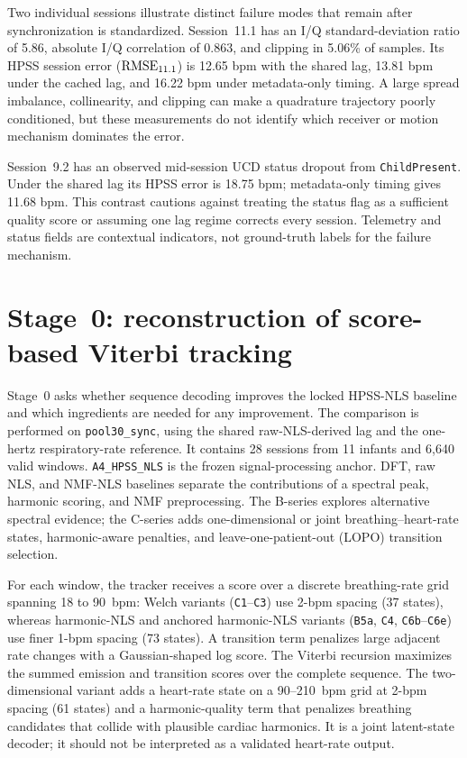 Two individual sessions illustrate distinct failure modes that remain after synchronization is
standardized. Session~11.1 has an I/Q standard-deviation ratio of 5.86, absolute I/Q correlation
of 0.863, and clipping in 5.06\% of samples. Its HPSS session error ($\mathrm{RMSE}_{11.1}$) is 12.65 bpm with the shared
lag, 13.81 bpm under the cached lag, and 16.22 bpm under metadata-only timing. A large spread
imbalance, collinearity, and clipping can make a quadrature trajectory poorly conditioned, but
these measurements do not identify which receiver or motion mechanism dominates the error.

Session~9.2 has an observed mid-session UCD status dropout from \texttt{ChildPresent}. Under the shared
lag its HPSS error is 18.75 bpm; metadata-only timing gives 11.68 bpm. This contrast cautions
against treating the status flag as a sufficient quality score or assuming one lag regime corrects
every session. Telemetry and status fields are contextual indicators, not ground-truth labels for
the failure mechanism.

\section{Stage~0: reconstruction of score-based Viterbi tracking}
\label{sec:ch3_viterbi_methods}

Stage~0 asks whether sequence decoding improves the locked HPSS-NLS baseline and which ingredients
are needed for any improvement. The comparison is performed on \texttt{pool30\_sync}, using the shared
raw-NLS-derived lag and the one-hertz respiratory-rate reference. It contains 28 sessions from 11
infants and 6,640 valid windows. \texttt{A4\_HPSS\_NLS} is the frozen signal-processing anchor. DFT, raw
NLS, and NMF-NLS baselines separate the contributions of a spectral peak, harmonic scoring, and
NMF preprocessing. The B-series explores alternative spectral evidence; the C-series adds
one-dimensional or joint breathing--heart-rate states, harmonic-aware penalties, and
leave-one-patient-out (LOPO) transition selection.

For each window, the tracker receives a score over a discrete breathing-rate grid spanning
18 to 90~bpm: Welch variants (\texttt{C1}--\texttt{C3}) use 2-bpm spacing (37 states), whereas
harmonic-NLS and anchored harmonic-NLS variants (\texttt{B5a}, \texttt{C4}, \texttt{C6b}--\texttt{C6e})
use finer 1-bpm spacing (73 states). A transition term
penalizes large adjacent rate changes with a Gaussian-shaped log score. The Viterbi recursion
maximizes the summed emission and transition scores over the complete sequence. The two-dimensional
variant adds a heart-rate state on a 90--210~bpm grid at 2-bpm spacing (61 states) and a
harmonic-quality term that penalizes
breathing candidates that collide with plausible cardiac harmonics. It is a joint latent-state
decoder; it should not be interpreted as a validated heart-rate output.

